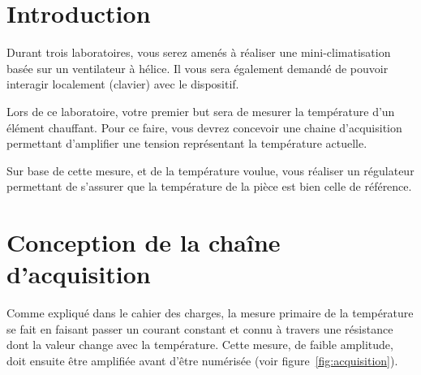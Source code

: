 \documentclass[11pt,a4paper]{article}
\theoremstyle{definition}%
\begin{document}
\section{Introduction}
Durant trois laboratoires, vous serez amenés à réaliser une mini-climatisation basée sur un ventilateur à hélice.
Il vous sera également demandé de pouvoir interagir localement (clavier) avec le dispositif.

Lors de ce laboratoire, votre premier but sera de mesurer la température d’un élément chauffant.
Pour ce faire, vous devrez concevoir une chaine d’acquisition permettant d’amplifier une tension représentant la température actuelle.

Sur base de cette mesure, et de la température voulue, vous réaliser un régulateur permettant de s’assurer que la température de la pièce est bien celle de référence.









\section{Conception de la chaîne d'acquisition}
Comme expliqué dans le cahier des charges, la mesure primaire de la température se fait en faisant passer un courant constant et connu à travers une résistance dont la valeur change avec la température.
Cette mesure, de faible amplitude, doit ensuite être amplifiée avant d’être numérisée (voir figure~\ref{fig:acquisition}).
\end{document}
